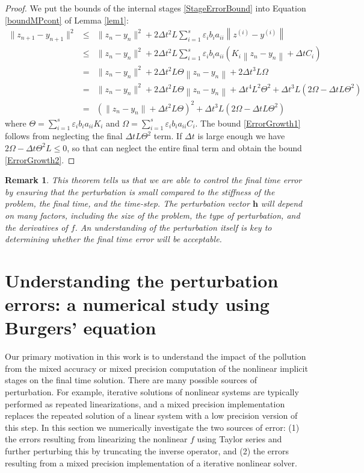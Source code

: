 \documentclass{siamart251104}
\newtheorem{rmk}{Remark}
\newcommand{\dt}{\Delta t}
\newcommand{\m}[1]{\mathbf{#1}}
\newcommand{\vh}{\m{h}}
\begin{document}
\begin{proof}
We put the bounds of the internal stages 
\eqref{StageErrorBound} into Equation \eqref{boundMPcont} 
of Lemma \ref{lem1}:
\begin{eqnarray*}
\|z_{n+1} - y_{n+1}\|^2 &\leq &
\|z_n - y_n\|^2  + 2 \dt^2 L \sum_{i=1}^s \varepsilon_i b_{i} a_{ii}
\left\| z^{(i)} -  y^{(i)} \right\|   \\
&\leq &   \|z_n - y_n\|^2  
+ 2 \dt^2 L \sum_{i=1}^s \varepsilon_i  b_{i} a_{ii} 
\left( K_i \left\|z_n - y_n\right\| 
+  \dt C_i   \right)  \\
& = &   \|z_n - y_n\|^2  
+ 2   \dt^2  L   \Theta  \left\|z_n - y_n\right\| + 
2  \dt^3  L    \Omega  \\
& = &   \|z_n - y_n\|^2  
+ 2  \dt^2 L \Theta
\left\|z_n - y_n\right\| 
+  \dt^4 L^2  \Theta^2   +  \dt^3 L  \left( 2 \Omega - \dt L \Theta^2  \right) \\
& = & \left(\|z_n - y_n\| + \dt^2 L \Theta \right)^2 + 
\dt^3 L  \left( 2 \Omega - \dt L \Theta^2  \right) 
\end{eqnarray*}   
where $\Theta = \sum_{i=1}^s \varepsilon_i b_{i} a_{ii} K_i $
and $\Omega = \sum_{i=1}^s \varepsilon_i b_{i} a_{ii}  C_i$.
The bound \eqref{ErrorGrowth1} follows from 
neglecting the final $\dt L \Theta^2  $ term.
If  $\dt$ is large enough we have
$ 2 \Omega - \dt \Theta^2 L  \leq 0 $,
so that can neglect the entire final term
and obtain the bound \eqref{ErrorGrowth2}.
\end{proof}

 \begin{rmk}
    This theorem tells us that we are able to control the final time error
    by ensuring that the perturbation is small compared to the stiffness of the problem,
    the final time, and the time-step. The perturbation vector $\vh$ will depend on many 
    factors, including the size of the problem, the type of perturbation, and the 
    derivatives of $f$. An understanding of the perturbation itself is key to
    determining whether the final time error will be acceptable.
 \end{rmk}
 
\section{Understanding the perturbation errors:  a numerical study using
Burgers' equation} \label{sec:sec3num}
Our primary motivation in this work is to understand the impact of the pollution 
from the mixed accuracy or mixed precision computation of the 
nonlinear implicit stages on the final time solution.  
There are many possible sources of perturbation. For example,
iterative solutions of nonlinear systems are typically performed
as repeated linearizations, and a mixed precision implementation replaces
the repeated solution of a linear system with a low precision version of this  step. 
In this section we numerically investigate  the two sources  of error: 
(1) the errors  resulting from  linearizing the nonlinear 
$f$ using Taylor series and further perturbing this by truncating the inverse operator, 
and (2) the errors resulting from a  mixed precision implementation of a iterative
nonlinear solver. 
\end{document}
